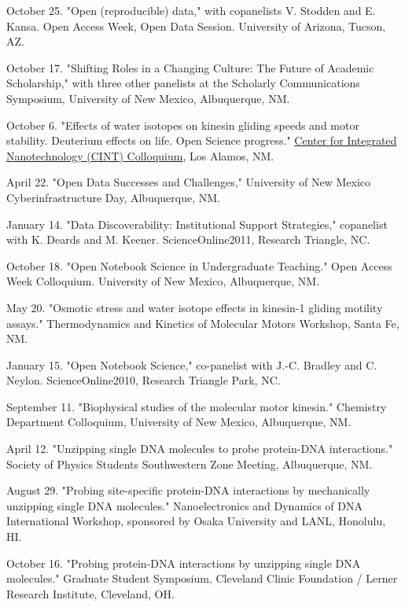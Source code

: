 \documentclass[11pt]{article}
\begin{document}
\medskip

 October 25. "Open (reproducible) data," with copanelists V. Stodden and E. Kansa. Open Access Week, Open Data Session.  University of Arizona, Tucson, AZ.

 October 17. "Shifting Roles in a Changing Culture: The Future of Academic Scholarship," with three other panelists at the Scholarly Communications Symposium, University of New Mexico, Albuquerque, NM.

 October 6. "Effects of water isotopes on kinesin gliding speeds and motor stability.  Deuterium effects on life.  Open Science progress." \href{http://goo.gl/XRjWQ}{Center for Integrated Nanotechnology (CINT) Colloquium}, Los Alamos, NM.

 April 22. "Open Data Successes and Challenges," University of New Mexico Cyberinfrastructure Day, Albuquerque, NM. 

 January 14. "Data Discoverability: Institutional Support Strategies," copanelist with K. Deards and M. Keener.  ScienceOnline2011, Research Triangle, NC.

 October 18. "Open Notebook Science in Undergraduate Teaching." Open Access Week Colloquium.  University of New Mexico, Albuquerque, NM.

 May 20. "Osmotic stress and water isotope effects in kinesin-1 gliding motility assays."  Thermodynamics and Kinetics of Molecular Motors Workshop, Santa Fe, NM.

 January 15. "Open Notebook Science," co-panelist with J.-C. Bradley and C. Neylon.  ScienceOnline2010, Research Triangle Park, NC.

 September 11. "Biophysical studies of the molecular motor kinesin." Chemistry Department Colloquium, University of New Mexico, Albuquerque, NM.

 April 12. "Unzipping single DNA molecules to probe protein-DNA interactions." Society of Physics Students Southwestern Zone Meeting, Albuquerque, NM.

 August 29. "Probing site-specific protein-DNA interactions by mechanically unzipping single DNA molecules." Nanoelectronics and Dynamics of DNA International Workshop, sponsored by Osaka University and LANL, Honolulu, HI.

 October 16. "Probing protein-DNA interactions by unzipping single DNA molecules." Graduate Student Symposium, Cleveland Clinic Foundation / Lerner Research Institute, Cleveland, OH.
\end{document}
